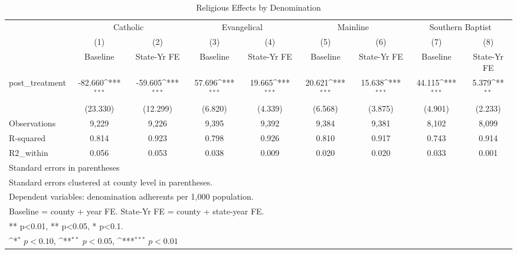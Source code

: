 \begin{table}[htbp]\centering
\def\sym#1{\ifmmode^{#1}\else\(^{#1}\)\fi}
\caption{Religious Effects by Denomination}
\begin{tabular}{l*{8}{c}}
\hline\hline
            &\multicolumn{2}{c}{Catholic}               &\multicolumn{2}{c}{Evangelical}            &\multicolumn{2}{c}{Mainline}               &\multicolumn{2}{c}{Southern Baptist}       \\\cmidrule(lr){2-3}\cmidrule(lr){4-5}\cmidrule(lr){6-7}\cmidrule(lr){8-9}
            &\multicolumn{1}{c}{(1)}&\multicolumn{1}{c}{(2)}&\multicolumn{1}{c}{(3)}&\multicolumn{1}{c}{(4)}&\multicolumn{1}{c}{(5)}&\multicolumn{1}{c}{(6)}&\multicolumn{1}{c}{(7)}&\multicolumn{1}{c}{(8)}\\
            &\multicolumn{1}{c}{Baseline}&\multicolumn{1}{c}{State-Yr FE}&\multicolumn{1}{c}{Baseline}&\multicolumn{1}{c}{State-Yr FE}&\multicolumn{1}{c}{Baseline}&\multicolumn{1}{c}{State-Yr FE}&\multicolumn{1}{c}{Baseline}&\multicolumn{1}{c}{State-Yr FE}\\
\hline
post\_treatment&     -82.660\sym{***}&     -59.605\sym{***}&      57.696\sym{***}&      19.665\sym{***}&      20.621\sym{***}&      15.638\sym{***}&      44.115\sym{***}&       5.379\sym{**} \\
            &    (23.330)         &    (12.299)         &     (6.820)         &     (4.339)         &     (6.568)         &     (3.875)         &     (4.901)         &     (2.233)         \\
\hline
Observations&       9,229         &       9,226         &       9,395         &       9,392         &       9,384         &       9,381         &       8,102         &       8,099         \\
R-squared   &       0.814         &       0.923         &       0.798         &       0.926         &       0.810         &       0.917         &       0.743         &       0.914         \\
R2\_within   &       0.056         &       0.053         &       0.038         &       0.009         &       0.020         &       0.020         &       0.033         &       0.001         \\
\hline\hline
\multicolumn{9}{l}{\footnotesize Standard errors in parentheses}\\
\multicolumn{9}{l}{\footnotesize Standard errors clustered at county level in parentheses.}\\
\multicolumn{9}{l}{\footnotesize Dependent variables: denomination adherents per 1,000 population.}\\
\multicolumn{9}{l}{\footnotesize Baseline = county + year FE. State-Yr FE = county + state-year FE.}\\
\multicolumn{9}{l}{\footnotesize *** p<0.01, ** p<0.05, * p<0.1.}\\
\multicolumn{9}{l}{\footnotesize \sym{*} \(p<0.10\), \sym{**} \(p<0.05\), \sym{***} \(p<0.01\)}\\
\end{tabular}
\end{table}
